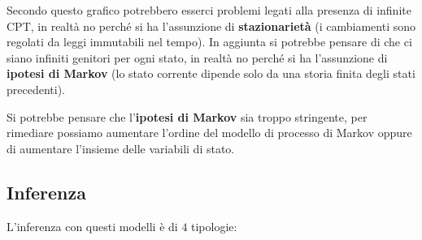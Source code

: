 Secondo questo grafico potrebbero esserci problemi legati alla presenza di infinite 
CPT, in realtà no perché si ha l'assunzione di \textbf{stazionarietà} (i cambiamenti 
sono regolati da leggi immutabili nel tempo). In aggiunta si potrebbe pensare di 
che ci siano infiniti genitori per ogni stato, in realtà no perché si ha l'assunzione 
di \textbf{ipotesi di Markov} (lo stato corrente dipende solo da una storia finita 
degli stati precedenti).

Si potrebbe pensare che l'\textbf{ipotesi di Markov} sia troppo stringente, per 
rimediare possiamo aumentare l'ordine del modello di processo di Markov oppure di 
aumentare l'insieme delle variabili di stato.

\subsection{Inferenza}
L'inferenza con questi modelli è di $4$ tipologie:
